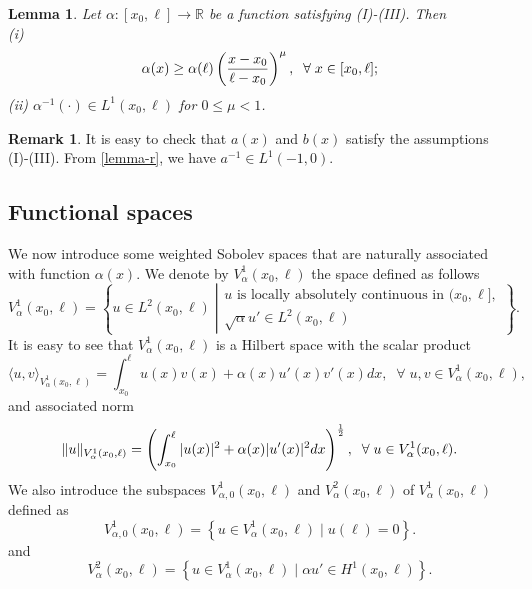 \documentclass[twoside]{article}
\newtheorem{lemma}[definition]{Lemma}
\theoremstyle{noparens}
\theoremstyle{definition}
\newtheorem{remark}[definition]{Remark}
\numberwithin{equation}{section}
\numberwithin{figure}{section}
\begin{document}
\begin{lemma}
	Let $\alpha:[x_0,\ell]\rightarrow\mathbb{R}$ be a function satisfying (I)-(III). Then\\
	(i)
	\begin{equation}\label{lemma-r}
		\alpha(x)\geq \alpha(\ell)\left({x - x_0\over \ell- x_0}\right)^{\mu},\;\;\forall\; x\in[x_0,\ell];
	\end{equation}
	(ii) ${\alpha}^{-1}(\cdot)\in L^1(x_0,\ell)$ for $0\leq\mu<1$.
\end{lemma}

\begin{remark}
	It is easy to check that $a(x)$ and $b(x)$ satisfy the assumptions (I)-(III). From \eqref{lemma-r}, we have $a^{-1}\in L^1(-1,0)$.
\end{remark}
\subsection{Functional spaces}
We now introduce some weighted Sobolev spaces that are naturally associated with function $\alpha(x)$.
We denote by $V_{\alpha}^1(x_0,\ell)$ the space defined as follows
\begin{equation*}
	V_{\alpha}^1(x_0,\ell) = \left\{ u\in L^2(x_0,\ell)\;
	\left|\begin{array}{l}
		u\mbox{ is locally absolutely continuous in } (x_0,\ell],\\
		\sqrt{{\alpha}}u'\in L^2(x_0,\ell)
	\end{array}\right. \right\}.
\end{equation*}
It is easy to see that $V_{\alpha}^1(x_0,\ell)$ is a Hilbert space with the scalar product
\begin{equation*}
	\langle u ,v\rangle_
	{V_{\alpha}^1(x_0,\ell)}
	=\int_{x_0}^{\ell}
	u(x)v(x) + {\alpha}(x)u'(x)v'(x) dx,\;\;
	\forall\;u,v\in V_{\alpha}^1(x_0,\ell),
\end{equation*}
and associated norm
\begin{equation*}
	\|u\|_{V_{\alpha}^1(x_0,\ell)}
	=\left(\int_{x_0}^{\ell} |u(x)|^2 + {\alpha}(x)|u'(x)|^2 dx\right)^{1\over2},\;\;
	\forall\;u\in V_{\alpha}^1(x_0,\ell).
\end{equation*}
We also introduce the subspaces  $V_{\alpha,0}^1(x_0,\ell)$ and $V_{\alpha}^2(x_0,\ell)$ of $V_{\alpha}^1(x_0,\ell)$ defined as
\begin{equation*}
	V_{{\alpha},0}^1(x_0,\ell) = \left\{ u \in V_{\alpha}^1(x_0,\ell)\; |\; u(\ell) = 0\right\}.
\end{equation*}
and
\begin{equation*}
	V_{\alpha}^2(x_0,\ell) = \left\{ u \in V_{\alpha}^1(x_0,\ell)\;|\; {\alpha}u'\in H^1(x_0,\ell)\right\}.
\end{equation*}
\end{document}
